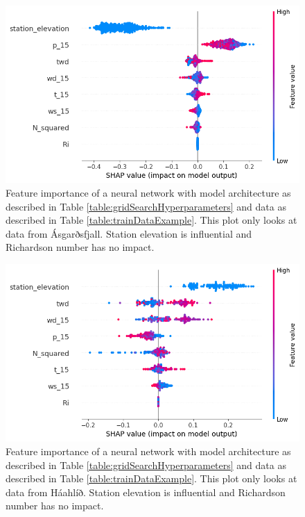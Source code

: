 \begin{figure}[H]
    \centering
    \includegraphics[scale = 0.6]{Figures/shap_plots/summary_plot_6745.png}
    \caption[Shapley Summary plot at Ásgarðsfjall.]{Feature importance of a neural network with model architecture as described in Table \ref{table:gridSearchHyperparameters} and data as described in Table \ref{table:trainDataExample}. This plot only looks at data from Ásgarðsfjall. Station elevation is influential and Richardson number has no impact.}
    \label{fig:ShapleySummaryAsgarðsfjall}
\end{figure}

\begin{figure}[H]
    \centering
    \includegraphics[scale = 0.6]{Figures/shap_plots/summary_plot_1470.png}
    \caption[Shapley Summary plot at Háahlíð.]{Feature importance of a neural network with model architecture as described in Table \ref{table:gridSearchHyperparameters} and data as described in Table \ref{table:trainDataExample}. This plot only looks at data from Háahlíð. Station elevation is influential and Richardson number has no impact.}
    \label{fig:ShapleySummaryHaahlid}
\end{figure}